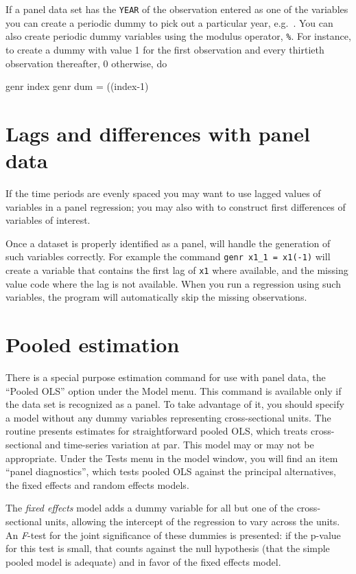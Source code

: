 If a panel data set has the \verb+YEAR+ of the observation entered as
one of the variables you can create a periodic dummy to pick out a
particular year, e.g.\ .  You can also
create periodic dummy variables using the modulus operator,
\verb+%+.  For instance, to create a dummy with
value 1 for the first observation and every thirtieth observation
thereafter, 0 otherwise, do
\begin{code}
      genr index 
      genr dum = ((index-1)%
\end{code}

\section{Lags and differences with panel data}
\label{panel-lagged}

If the time periods are evenly spaced you may want to use lagged
values of variables in a panel regression; you may also with to
construct first differences of variables of interest.

Once a dataset is properly identified as a panel,  will
handle the generation of such variables correctly.  For example the
command \verb+genr x1_1 = x1(-1)+ will create a variable that contains
the first lag of \verb+x1+ where available, and the missing value code
where the lag is not available.  When you run a regression using such
variables, the program will automatically skip the missing
observations.

\section{Pooled estimation}
\label{pooled-est}

There is a special purpose estimation command for use with panel data,
the ``Pooled OLS'' option under the \textsf{Model} menu. This command
is available only if the data set is recognized as a panel.  To take
advantage of it, you should specify a model without any dummy
variables representing cross-sectional units.  The routine presents
estimates for straightforward pooled OLS, which treats cross-sectional
and time-series variation at par.  This model may or may not be
appropriate.  Under the \textsf{Tests} menu in the model window, you
will find an item ``panel diagnostics'', which tests pooled OLS
against the principal alternatives, the fixed effects and random
effects models.

The \emph{fixed effects} model adds a dummy variable for all but one
of the cross-sectional units, allowing the intercept of the regression
to vary across the units.  An \emph{F}-test for the joint significance
of these dummies is presented: if the p-value for this test is small,
that counts against the null hypothesis (that the simple pooled model
is adequate) and in favor of the fixed effects model.

